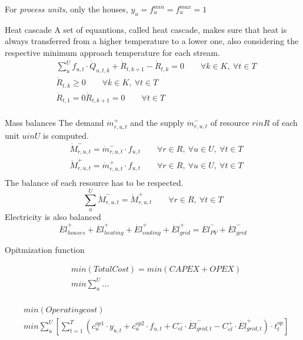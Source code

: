 \documentclass{article}
\begin{document}
For \textit{process units}, only the houses, $y_{u} = f_{u}^{min} = f_{u}^{max} = 1$

Heat cascade
A set of equantions, called heat cascade, makes sure that heat is always transferred from a higher temperature to a lower one, also considering the respective minimum approach temperature for each stream.
\begin{align}
& \sum_{u}^{U} f_{u,t}  \cdot \dot{Q}_{u,t,k} + \dot{R}_{t,k+1} - \dot{R}_{t,k} = 0 \qquad \forall k \in K, \ \forall t \in T \\
& \dot{R}_{t,k} \geq 0 \qquad \forall k \in K, \ \forall t \in T  \\
& \dot{R}_{t,1} = 0 \dot{R}_{t,k+1} = 0 \qquad \forall t \in T  \\
\end{align}

Mass balances
The demand $\dot{m}_{r,u,t}^{+}$ and the supply $\dot{m}_{r,u,t}^{-}$ of resource $r in R$ of each unit $u in U$ is computed.
\begin{align}
& \dot{M}_{r,u,t}^{-} = \dot{m}_{r,u,t}^{-} \cdot f_{u,t} \qquad \forall r \in R, \ \forall u \in U, \ \forall t \in T \\
& \dot{M}_{r,u,t}^{+} = \dot{m}_{r,u,t}^{+} \cdot f_{u,t} \qquad \forall r \in R, \ \forall u \in U, \ \forall t \in T  \\
\end{align}
The balance of each resource has to be respected.
\begin{equation}
\sum_{u}^{U} \dot{M}_{r,u,t}^{-} = \dot{M}_{r,u,t}^{+} \qquad \forall r \in R, \ \forall t \in T
\end{equation}
Electricity is also balanced
\begin{equation}
\dot{El}_{houses}^{+} + \dot{El}_{heating}^{+} + \dot{El}_{cooling}^{+} + \dot{El}_{grid}^{+} = \dot{El}_{PV}^{-} + \dot{El}_{grid}^{-}
\end{equation}

Opitmization function

\begin{align}
& min \left( TotalCost \right)  = min \left(  CAPEX + OPEX \right) \\
& min \sum_{u}^{U} ... \\
\end{align}

\begin{align}
& min \left( Operating cost \right) \\
& min \sum_{u}^{U} \left[ \sum_{t = 1}^{T} \left( c_{u}^{op1} \cdot y_{u,t} + c_{u}^{op2} \cdot f_{u,t} + C_{el}^{-} \cdot \dot{El}_{grid,t}^{-} - C_{el}^{+} \cdot \dot{El}_{grid,t}^{+} \right) \cdot t_{t}^{op} \right] \\
\end{align}
\end{document}
